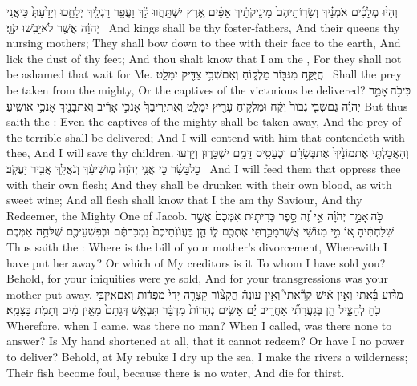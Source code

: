 {וְהָי֨וּ מְלָכִ֜ים אֹמְנַ֗יִךְ וְשָׂרֽוֹתֵיהֶם֙ מֵינִ֣יקֹתַ֔יִךְ אַפַּ֗יִם אֶ֚רֶץ יִשְׁתַּ֣חֲווּ לָ֔ךְ וַעֲפַ֥ר רַגְלַ֖יִךְ יְלַחֵ֑כוּ וְיָדַ֙עַתְּ֙ כִּי\maqqaf אֲנִ֣י יְהֹוָ֔ה אֲשֶׁ֥ר לֹא\maqqaf יֵבֹ֖שׁוּ קֹוָֽי׃ \setuma }
{And kings shall be thy foster-fathers, And their queens thy nursing mothers; They shall bow down to thee with their face to the earth, And lick the dust of thy feet; And thou shalt know that I am the \lord, For they shall not be ashamed that wait for Me.}
{הֲיֻקַּ֥ח מִגִּבּ֖וֹר מַלְק֑וֹחַ וְאִם\maqqaf שְׁבִ֥י צַדִּ֖יק יִמָּלֵֽט׃ \setuma }
{Shall the prey be taken from the mighty, Or the captives of the victorious be delivered?}
{כִּי\maqqaf כֹ֣ה \legarmeh  אָמַ֣ר יְהֹוָ֗ה גַּם\maqqaf שְׁבִ֤י גִבּוֹר֙ יֻקָּ֔ח וּמַלְק֥וֹחַ עָרִ֖יץ יִמָּלֵ֑ט וְאֶת\maqqaf יְרִיבֵךְ֙ אָנֹכִ֣י אָרִ֔יב וְאֶת\maqqaf בָּנַ֖יִךְ אָנֹכִ֥י אוֹשִֽׁיעַ׃}
{But thus saith the \lord: Even the captives of the mighty shall be taken away, And the prey of the terrible shall be delivered; And I will contend with him that contendeth with thee, And I will save thy children.}
{וְהַאֲכַלְתִּ֤י אֶת\maqqaf מוֹנַ֙יִךְ֙ אֶת\maqqaf בְּשָׂרָ֔ם וְכֶעָסִ֖יס דָּמָ֣ם יִשְׁכָּר֑וּן וְיָדְע֣וּ כׇל\maqqaf בָּשָׂ֗ר כִּ֣י אֲנִ֤י יְהֹוָה֙ מֽוֹשִׁיעֵ֔ךְ וְגֹאֲלֵ֖ךְ אֲבִ֥יר יַעֲקֹֽב׃ \setuma }
{And I will feed them that oppress thee with their own flesh; And they shall be drunken with their own blood, as with sweet wine; And all flesh shall know that I the \lord\space am thy Saviour, And thy Redeemer, the Mighty One of Jacob.}
\newperek
{}
{כֹּ֣ה \legarmeh  אָמַ֣ר יְהֹוָ֗ה אֵ֣י זֶ֠ה סֵ֣פֶר כְּרִית֤וּת אִמְּכֶם֙ אֲשֶׁ֣ר שִׁלַּחְתִּ֔יהָ א֚וֹ מִ֣י מִנּוֹשַׁ֔י אֲשֶׁר\maqqaf מָכַ֥רְתִּי אֶתְכֶ֖ם ל֑וֹ הֵ֤ן בַּעֲוֺנֹֽתֵיכֶם֙ נִמְכַּרְתֶּ֔ם וּבְפִשְׁעֵיכֶ֖ם שֻׁלְּחָ֥ה אִמְּכֶֽם׃}
{Thus saith the \lord: Where is the bill of your mother’s divorcement, Wherewith I have put her away? Or which of My creditors is it To whom I have sold you? Behold, for your iniquities were ye sold, And for your transgressions was your mother put away.}
{מַדּ֨וּעַ בָּ֜אתִי וְאֵ֣ין אִ֗ישׁ קָרָ֘אתִי֮ וְאֵ֣ין עוֹנֶה֒ הֲקָצ֨וֹר קָצְרָ֤ה יָדִי֙ מִפְּד֔וּת וְאִם\maqqaf אֵֽין\maqqaf בִּ֥י כֹ֖חַ לְהַצִּ֑יל הֵ֣ן בְּגַעֲרָתִ֞י אַחֲרִ֣יב יָ֗ם אָשִׂ֤ים נְהָרוֹת֙ מִדְבָּ֔ר תִּבְאַ֤שׁ דְּגָתָם֙ מֵאֵ֣ין מַ֔יִם וְתָמֹ֖ת בַּצָּמָֽא׃}
{Wherefore, when I came, was there no man? When I called, was there none to answer? Is My hand shortened at all, that it cannot redeem? Or have I no power to deliver? Behold, at My rebuke I dry up the sea, I make the rivers a wilderness; Their fish become foul, because there is no water, And die for thirst.}
